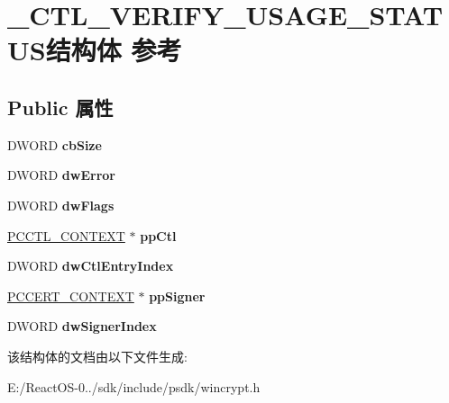 \hypertarget{struct___c_t_l___v_e_r_i_f_y___u_s_a_g_e___s_t_a_t_u_s}{}\section{\+\_\+\+C\+T\+L\+\_\+\+V\+E\+R\+I\+F\+Y\+\_\+\+U\+S\+A\+G\+E\+\_\+\+S\+T\+A\+T\+U\+S结构体 参考}
\label{struct___c_t_l___v_e_r_i_f_y___u_s_a_g_e___s_t_a_t_u_s}
\subsection*{Public 属性}
\begin{DoxyCompactItemize}
\item 
\mbox{\label{struct___c_t_l___v_e_r_i_f_y___u_s_a_g_e___s_t_a_t_u_s_a559ea37d215c1efffa46a217ae8fdee4}} 
D\+W\+O\+RD {\bfseries cb\+Size}
\item 
\mbox{\label{struct___c_t_l___v_e_r_i_f_y___u_s_a_g_e___s_t_a_t_u_s_a393a1a52d645eaae85c9fa0a2ef77f34}} 
D\+W\+O\+RD {\bfseries dw\+Error}
\item 
\mbox{\label{struct___c_t_l___v_e_r_i_f_y___u_s_a_g_e___s_t_a_t_u_s_a2e1b4a0b8f21eb1e6b864cafdb25e78c}} 
D\+W\+O\+RD {\bfseries dw\+Flags}
\item 
\mbox{\label{struct___c_t_l___v_e_r_i_f_y___u_s_a_g_e___s_t_a_t_u_s_ae26815f71ae5239ef255394f97ca76e1}} 
\hyperlink{struct___c_t_l___c_o_n_t_e_x_t}{P\+C\+C\+T\+L\+\_\+\+C\+O\+N\+T\+E\+XT} $\ast$ {\bfseries pp\+Ctl}
\item 
\mbox{\label{struct___c_t_l___v_e_r_i_f_y___u_s_a_g_e___s_t_a_t_u_s_aeab650dc835e59f411d11e8bed7a752f}} 
D\+W\+O\+RD {\bfseries dw\+Ctl\+Entry\+Index}
\item 
\mbox{\label{struct___c_t_l___v_e_r_i_f_y___u_s_a_g_e___s_t_a_t_u_s_ae00ea50998d4b01f85bf61fb5ac35da0}} 
\hyperlink{struct___c_e_r_t___c_o_n_t_e_x_t}{P\+C\+C\+E\+R\+T\+\_\+\+C\+O\+N\+T\+E\+XT} $\ast$ {\bfseries pp\+Signer}
\item 
\mbox{\label{struct___c_t_l___v_e_r_i_f_y___u_s_a_g_e___s_t_a_t_u_s_a037a1e49611614604fd3a41aac0769cd}} 
D\+W\+O\+RD {\bfseries dw\+Signer\+Index}
\end{DoxyCompactItemize}


该结构体的文档由以下文件生成\+:\begin{DoxyCompactItemize}
\item 
E\+:/\+React\+O\+S-\/0../sdk/include/psdk/wincrypt.\+h\end{DoxyCompactItemize}
